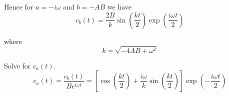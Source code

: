 Hence for $a=-i\omega$ and $b=-AB$ we have
\begin{equation*}
c_b(t)=\frac{2B}{k}
\sin\left(\frac{kt}{2}\right)
\exp\left(\frac{i\omega t}{2}\right)
\end{equation*}

where
\begin{equation*}
k=\sqrt{-4AB+\omega^2}
\end{equation*}

Solve for $c_a(t)$.
\begin{equation*}
c_a(t)=\frac{\dot c_b(t)}{Be^{i\omega t}}
=\left[
\cos\left(\frac{kt}{2}\right)+\frac{i\omega}{k}\sin\left(\frac{kt}{2}\right)
\right]\exp\left(-\frac{i\omega t}{2}\right)
\end{equation*}


